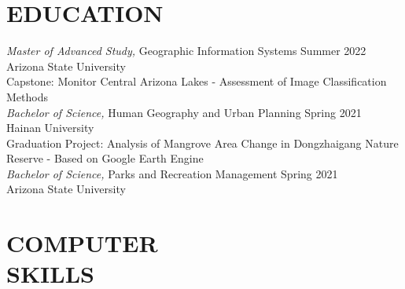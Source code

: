 \documentclass[margin,10pt]{res} %
\begin{document}
\begin{resume}

 


\singlespacing

\section{EDUCATION}

{\sl Master of Advanced Study,} Geographic Information Systems \hfill Summer 2022 \\ %
Arizona State University \\
Capstone: Monitor Central Arizona Lakes - Assessment of Image Classification Methods \vspace{1.5mm}\\
{\sl Bachelor of Science,} Human Geography and Urban Planning \hfill Spring 2021 \\
Hainan University \\
Graduation Project: Analysis of Mangrove Area Change in Dongzhaigang Nature Reserve - Based on Google Earth Engine \vspace{1.5mm}\\
{\sl Bachelor of Science,} Parks and Recreation Management \hfill Spring 2021 \\
Arizona State University \\


\section{COMPUTER \\ SKILLS} 


\end{resume}
\end{document}
